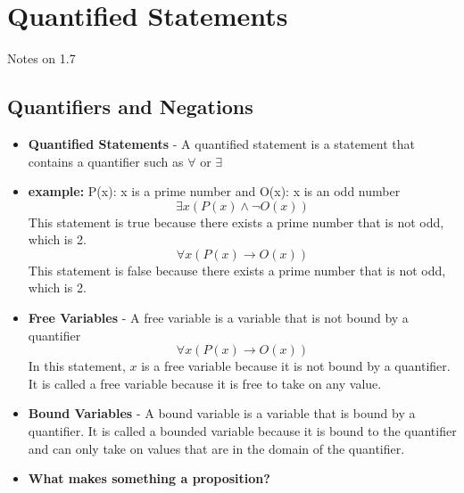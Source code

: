 \documentclass{article}
\begin{document}
    \section{Quantified Statements}{Notes on 1.7}
    \subsection{Quantifiers and Negations}
    \begin{itemize}
        \item[] \textbf{Quantified Statements} - A quantified statement is a statement that contains a quantifier
        such as $\forall$ or $\exists$
        \item[] \textbf{example:}
            P(x): x is a prime number and O(x): x is an odd number
        \[
            \exists x(P(x) \land \lnot O(x)) 
        \]
        This statement is true because there exists a prime number that is not odd, which is 2.
        \[            
            \forall x(P(x) \rightarrow O(x))
        \]
        This statement is false because there exists a prime number that is not odd, which is 2.
        \item[] \textbf{Free Variables} - A free variable is a variable that is not bound by a quantifier
        \[
            \forall x(P(x) \rightarrow O(x))
        \]
        In this statement, $x$ is a free variable because it is not bound by a quantifier. It is called a free variable
        because it is free to take on any value.

        \item[] \textbf{Bound Variables} - A bound variable is a variable that is bound by a quantifier. It is called a
        bounded variable because it is bound to the quantifier and can only take on values that are in the domain of the
        quantifier.

        \item[] \textbf{What makes something a proposition?}
            \begin{itemize}
                

\end{itemize}
\end{itemize}
\end{document}
